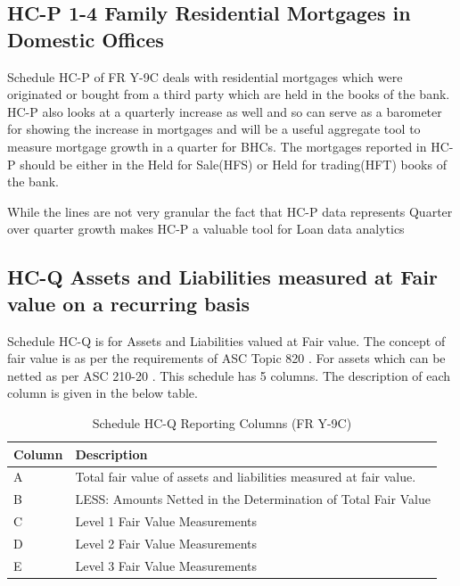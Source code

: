 \documentclass[conference]{IEEEtran}
\begin{document}
	\subsection{HC-P 1-4 Family Residential Mortgages in Domestic Offices}
	Schedule HC-P of FR Y-9C deals with residential mortgages which were originated or bought from a third party which are held in the books of the bank. HC-P also looks at a quarterly increase as well and so can serve as a barometer for showing the increase in mortgages and will be a useful aggregate tool to measure mortgage growth in a quarter for BHCs. The mortgages reported in HC-P should be either in the Held for Sale(HFS) or Held for trading(HFT) books of the bank.
	
	While the lines are not very granular the fact that HC-P data represents Quarter over quarter growth makes HC-P a valuable tool for Loan data analytics
	
	\subsection{HC-Q Assets and Liabilities measured at Fair value on a recurring basis}
	
	Schedule HC-Q is for Assets and Liabilities valued at Fair value. The concept of fair value is as per the requirements of ASC Topic 820 \cite{ASC820}. For assets which can be netted as per ASC 210-20 \cite{ASC210}. This schedule has 5 columns. The description of each column is given in the below table.
	
	\begin{table}[htbp]
		\centering
		\caption{Schedule HC-Q Reporting Columns (FR Y-9C)}
		\begin{tabular}{|p{1.8cm}|p{6.2cm}|}
			\hline
			\textbf{Column} & \textbf{Description} \\
			\hline
			A & Total fair value of assets and liabilities measured at fair value. \\
			\hline
			B & LESS: Amounts Netted in the Determination of Total Fair Value \\
			\hline
			C & Level 1 Fair Value Measurements \\
			\hline
			D & Level 2 Fair Value Measurements \\
			\hline
			E & Level 3 Fair Value Measurements \\
			\hline
		\end{tabular}
	\end{table}
	
\end{document}
